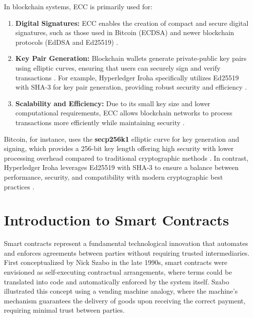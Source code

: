 \documentclass{article}
\begin{document}
In blockchain systems, ECC is primarily used for:
\begin{enumerate}
    \item \textbf{Digital Signatures:} ECC enables the creation of compact and secure digital signatures, such as those used in Bitcoin (ECDSA) and newer blockchain protocols (EdDSA and Ed25519) \cite{johnson2001elliptic, bernstein2012high}.
    \item \textbf{Key Pair Generation:} Blockchain wallets generate private-public key pairs using elliptic curves, ensuring that users can securely sign and verify transactions \cite{wu2018blockchain}. For example, Hyperledger Iroha specifically utilizes Ed25519 with SHA-3 for key pair generation, providing robust security and efficiency \cite{hyperledger_iroha}.
    \item \textbf{Scalability and Efficiency:} Due to its small key size and lower computational requirements, ECC allows blockchain networks to process transactions more efficiently while maintaining security \cite{fan2018analysis}.
\end{enumerate}

Bitcoin, for instance, uses the \textbf{secp256k1} elliptic curve for key generation and signing, which provides a 256-bit key length offering high security with lower processing overhead compared to traditional cryptographic methods \cite{brown2010standards}. In contrast, Hyperledger Iroha leverages Ed25519 with SHA-3 to ensure a balance between performance, security, and compatibility with modern cryptographic best practices \cite{hyperledger_iroha}.



\section{Introduction to Smart Contracts}

Smart contracts represent a fundamental technological innovation that automates and enforces agreements between parties without requiring trusted intermediaries. First conceptualized by Nick Szabo in the late 1990s, smart contracts were envisioned as self-executing contractual arrangements, where terms could be translated into code and automatically enforced by the system itself\cite{szabo1996smart}. Szabo illustrated this concept using a vending machine analogy, where the machine's mechanism guarantees the delivery of goods upon receiving the correct payment, requiring minimal trust between parties\cite{szabo1997formalizing}.
\end{document}
